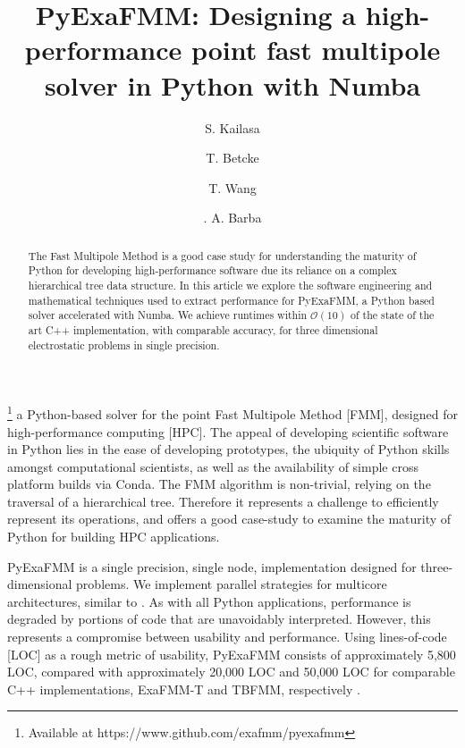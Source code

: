 \documentclass{IEEEcsmag}
\begin{document}

\title{PyExaFMM: Designing a high-performance point fast multipole solver in Python with Numba}

\author{S. Kailasa}

\author{T. Betcke}

\author{T. Wang}

\author{. A. Barba}


\begin{abstract}
The Fast Multipole Method is a good case study for understanding the maturity of Python for developing high-performance software due its reliance on a complex hierarchical tree data structure. In this article we explore the software engineering and mathematical techniques used to extract performance for PyExaFMM, a Python based solver accelerated with Numba. We achieve runtimes within $\mathcal{O}(10)$ of the state of the art C++ implementation, with comparable accuracy, for three dimensional electrostatic problems in single precision.
\end{abstract}

\maketitle
{}\footnote{Available at https://www.github.com/exafmm/pyexafmm} a Python-based solver for the point Fast Multipole Method [FMM], designed for high-performance computing [HPC]. The appeal of developing scientific software in Python lies in the ease of developing prototypes, the ubiquity of Python skills amongst computational scientists, as well as the availability of simple cross platform builds via Conda. The FMM algorithm is non-trivial, relying on the traversal of a hierarchical tree. Therefore it represents a challenge to efficiently represent its operations, and offers a good case-study to examine the maturity of Python for building HPC applications.

PyExaFMM is a single precision, single node, implementation designed for three-dimensional problems. We implement parallel strategies for multicore architectures, similar to \cite{Bramas2020, Wang2021}. As with all Python applications, performance is degraded by portions of code that are unavoidably interpreted. However, this represents a compromise between usability and performance. Using lines-of-code [LOC] as a rough metric of usability, PyExaFMM consists of approximately 5,800 LOC, compared with approximately 20,000 LOC and 50,000 LOC for comparable C++ implementations, ExaFMM-T and TBFMM, respectively \cite{Bramas2020, Wang2021}.
\end{document}
